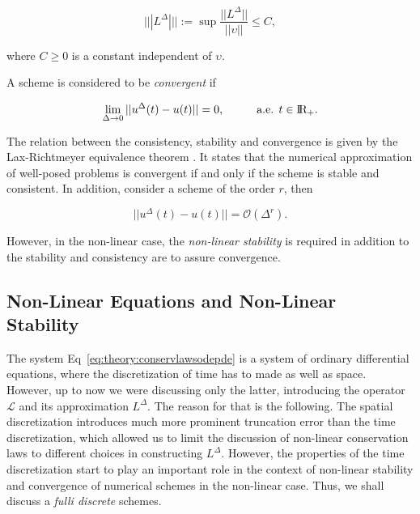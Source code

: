 \begin{equation}
|||L^{\Delta}||| := \sup \frac{||L^{\Delta}||}{||\upsilon||}\leq C,
\end{equation}

where $C\geq 0$ is a constant independent of $\upsilon$. 

A scheme is considered to be \textit{convergent} if 

\begin{equation}
\lim_{\Delta\rightarrow 0} ||u^{\Delta}(t)-u(t)|| = 0, \hspace{10mm} \text{a.e. } t\in \text{I\!R}_{+}.
\end{equation}

The relation between the consistency, stability and convergence is given by the Lax-Richtmeyer equivalence theorem \citep{Lax:1956}. It states that the numerical approximation of well-posed problems is convergent if and only if the scheme is stable and consistent. 
In addition, consider a scheme of the order $r$, then

\begin{equation}
|| u^{\Delta}(t) - u(t) || = \mathcal{O}(\Delta^r).
\end{equation}

However, in the non-linear case, the \textit{non-linear stability} is required in addition to the stability and consistency are to assure convergence. 


\subsection{Non-Linear Equations and Non-Linear Stability}

The system Eq~\eqref{eq:theory:conservlawsodepde} is a system of ordinary differential equations, where the discretization of time has to made as well as space. However, up to now we were discussing only the latter, introducing the operator $\mathcal{L}$ and its approximation $L^{\Delta}$. The reason for that is the following. The spatial discretization introduces much more prominent truncation error than the time discretization, which allowed us to limit the discussion of non-linear conservation laws to different choices in constructing $L^{\Delta}$. However, the properties of the time discretization start to play an important role in the context of non-linear stability and convergence of numerical schemes in the non-linear case. Thus, we shall discuss a \textit{fulli discrete} schemes. \\

